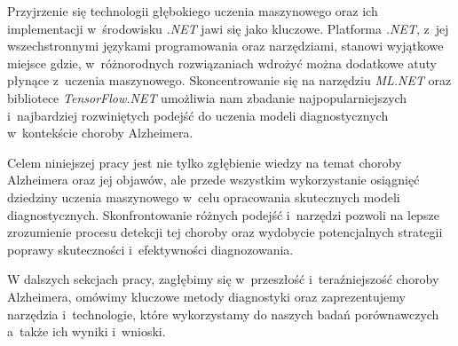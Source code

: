 Przyjrzenie się technologii głębokiego uczenia maszynowego oraz ich implementacji w~środowisku \emph{.NET} jawi się jako kluczowe.
Platforma \emph{.NET}, z~jej wszechstronnymi językami programowania oraz narzędziami, stanowi wyjątkowe miejsce gdzie, w~różnorodnych rozwiązaniach wdrożyć można dodatkowe atuty płynące z~uczenia maszynowego.
Skoncentrowanie się na narzędziu \emph{ML.NET} oraz bibliotece \emph{TensorFlow.NET} umożliwia nam zbadanie najpopularniejszych i~najbardziej rozwiniętych podejść do uczenia modeli diagnostycznych w~kontekście choroby Alzheimera.

Celem niniejszej pracy jest nie tylko zgłębienie wiedzy na temat choroby Alzheimera oraz jej objawów, ale przede wszystkim wykorzystanie osiągnięć dziedziny uczenia maszynowego w~celu opracowania skutecznych modeli diagnostycznych.
Skonfrontowanie różnych podejść i~narzędzi pozwoli na lepsze zrozumienie procesu detekcji tej choroby oraz wydobycie potencjalnych strategii poprawy skuteczności i~efektywności diagnozowania.

W dalszych sekcjach pracy, zagłębimy się w~przeszłość i~teraźniejszość choroby Alzheimera, omówimy kluczowe metody diagnostyki oraz zaprezentujemy narzędzia i~technologie, które wykorzystamy do naszych badań porównawczych a~także ich wyniki i~wnioski.
